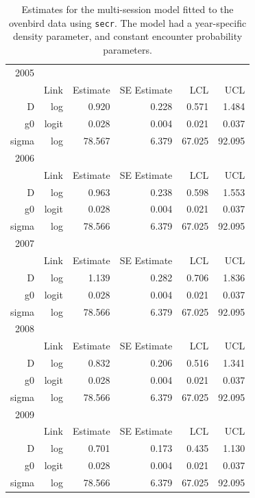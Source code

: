\begin{table}
\caption{Estimates for the multi-session model fitted to the ovenbird data
  using \mbox{\tt secr}. The model had a year-specific density
  parameter, and constant encounter probability parameters.}
\begin{tabular}{rrrrrr} \hline
2005 & & & & & \\ 
     &  Link  &  Estimate  & SE Estimate    &    LCL     &    UCL \\ \hline
D    &   log &  0.920 &  0.228 &  0.571  &  1.484 \\
g0   & logit &  0.028 &  0.004 & 0.021  &  0.037 \\
sigma &  log &  78.567& 6.379 &  67.025 &  92.095 \\ \hline

2006 & & & & & \\ 
     &  Link  &  Estimate  & SE Estimate    &    LCL     &    UCL \\ \hline
D    &   log &  0.963 & 0.238 &  0.598  &  1.553 \\
g0   & logit &  0.028 &  0.004 &  0.021 & 0.037 \\
sigma &  log & 78.566 & 6.379 &  67.025 & 92.095 \\ \hline

2007 & & & & & \\ 
     &  Link  &  Estimate  & SE Estimate    &    LCL     &    UCL \\ \hline 
D    &   log & 1.139  & 0.282 &  0.706 &  1.836 \\
g0   &  logit & 0.028 & 0.004&  0.021  &  0.037 \\
sigma &  log & 78.566 & 6.379  & 67.025 &  92.095 \\ \hline

2008 & & & & & \\ 
     &  Link  &  Estimate  & SE Estimate    &    LCL     &    UCL \\ \hline
D   &    log &  0.832  & 0.206 &  0.516  &  1.341 \\
g0  &  logit & 0.028   &  0.004 &  0.021 &  0.037 \\
sigma  & log &  78.566 &  6.379 & 67.025 & 92.095 \\ \hline

2009 & & & & & \\ 
     &  Link  &  Estimate  & SE Estimate    &    LCL     &    UCL \\ \hline
D    &   log &  0.701 & 0.173 & 0.435  & 1.130 \\
g0  &  logit & 0.028  & 0.004 &  0.021 &  0.037 \\
sigma &  log & 78.566 & 6.379 & 67.025 & 92.095 \\ \hline
\end{tabular}
\label{multisessionsecr.output}
\end{table}


